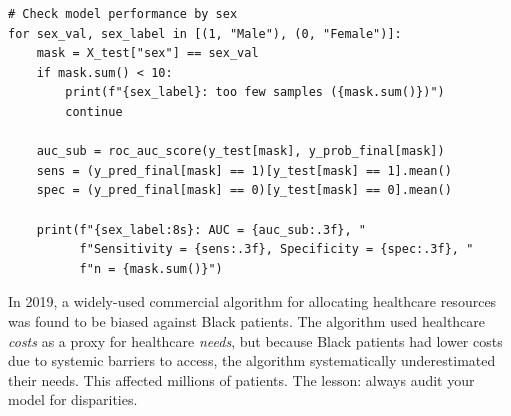 \begin{verbatim}
# Check model performance by sex
for sex_val, sex_label in [(1, "Male"), (0, "Female")]:
    mask = X_test["sex"] == sex_val
    if mask.sum() < 10:
        print(f"{sex_label}: too few samples ({mask.sum()})")
        continue

    auc_sub = roc_auc_score(y_test[mask], y_prob_final[mask])
    sens = (y_pred_final[mask] == 1)[y_test[mask] == 1].mean()
    spec = (y_pred_final[mask] == 0)[y_test[mask] == 0].mean()

    print(f"{sex_label:8s}: AUC = {auc_sub:.3f}, "
          f"Sensitivity = {sens:.3f}, Specificity = {spec:.3f}, "
          f"n = {mask.sum()}")
\end{verbatim}

\begin{clinicalnote}
In 2019, a widely-used commercial algorithm for allocating healthcare resources was found to be biased against Black patients. The algorithm used healthcare \emph{costs} as a proxy for healthcare \emph{needs}, but because Black patients had lower costs due to systemic barriers to access, the algorithm systematically underestimated their needs. This affected millions of patients. The lesson: always audit your model for disparities.
\end{clinicalnote}

